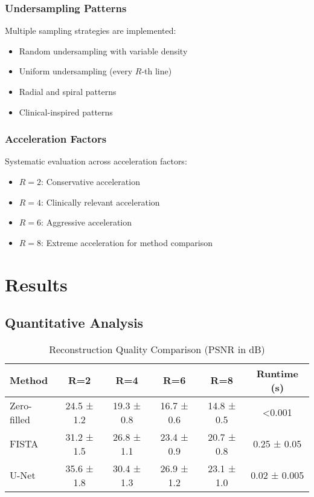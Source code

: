 \documentclass[11pt,a4paper]{article}
\begin{document}
\subsubsection{Undersampling Patterns}

Multiple sampling strategies are implemented:
\begin{itemize}
    \item Random undersampling with variable density
    \item Uniform undersampling (every $R$-th line)
    \item Radial and spiral patterns
    \item Clinical-inspired patterns
\end{itemize}

\subsubsection{Acceleration Factors}

Systematic evaluation across acceleration factors:
\begin{itemize}
    \item $R = 2$: Conservative acceleration
    \item $R = 4$: Clinically relevant acceleration
    \item $R = 6$: Aggressive acceleration
    \item $R = 8$: Extreme acceleration for method comparison
\end{itemize}

\section{Results}

\subsection{Quantitative Analysis}

\begin{table}[H]
\centering
\caption{Reconstruction Quality Comparison (PSNR in dB)}
\label{tab:results_psnr}
\begin{tabular}{@{}lccccc@{}}
\toprule
\textbf{Method} & \textbf{R=2} & \textbf{R=4} & \textbf{R=6} & \textbf{R=8} & \textbf{Runtime (s)} \\
\midrule
Zero-filled & 24.5 ± 1.2 & 19.3 ± 0.8 & 16.7 ± 0.6 & 14.8 ± 0.5 & <0.001 \\
FISTA & 31.2 ± 1.5 & 26.8 ± 1.1 & 23.4 ± 0.9 & 20.7 ± 0.8 & 0.25 ± 0.05 \\
U-Net & 35.6 ± 1.8 & 30.4 ± 1.3 & 26.9 ± 1.2 & 23.1 ± 1.0 & 0.02 ± 0.005 \\
\bottomrule
\end{tabular}
\end{table}
\end{document}
